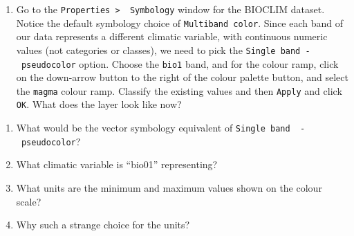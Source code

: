 \documentclass[
  letterpaper,
  DIV=11,
  numbers=noendperiod]{scrreprt}
\providecommand{\tightlist}{%
  \setlength{\itemsep}{0pt}\setlength{\parskip}{0pt}}\usepackage{longtable,booktabs,array}
\begin{document}
\begin{enumerate}
\def\labelenumi{(\arabic{enumi})}
\setcounter{enumi}{138}
\tightlist
\item
  Go to the \texttt{Properties\ \textgreater{}\ \ Symbology} window for
  the BIOCLIM dataset. Notice the default symbology choice of
  \texttt{Multiband\ color}. Since each band of our data represents a
  different climatic variable, with continuous numeric values (not
  categories or classes), we need to pick the
  \texttt{Single\ band\ -\ pseudocolor} option. Choose the \texttt{bio1}
  band, and for the colour ramp, click on the down-arrow button to the
  right of the colour palette button, and select the \texttt{magma}
  colour ramp. Classify the existing values and then \texttt{Apply} and
  click \texttt{OK}. What does the layer look like now?
\end{enumerate}

\begin{tcolorbox}[enhanced jigsaw, coltitle=black, toprule=.15mm, breakable, opacitybacktitle=0.6, left=2mm, colback=white, leftrule=.75mm, rightrule=.15mm, colbacktitle=quarto-callout-important-color!10!white, toptitle=1mm, titlerule=0mm, colframe=quarto-callout-important-color-frame, arc=.35mm, bottomtitle=1mm, opacityback=0, bottomrule=.15mm, title=\textcolor{quarto-callout-important-color}{\faExclamation}\hspace{0.5em}{Stop and Think}]

\begin{enumerate}
\def\labelenumi{\alph{enumi})}
\item
  What would be the vector symbology equivalent of
  \texttt{Single\ band\ \ -\ pseudocolor}?
\item
  What climatic variable is ``bio01'' representing?
\item
  What units are the minimum and maximum values shown on the colour
  scale?
\item
  Why such a strange choice for the units?
\end{enumerate}

\end{tcolorbox}
\end{document}
